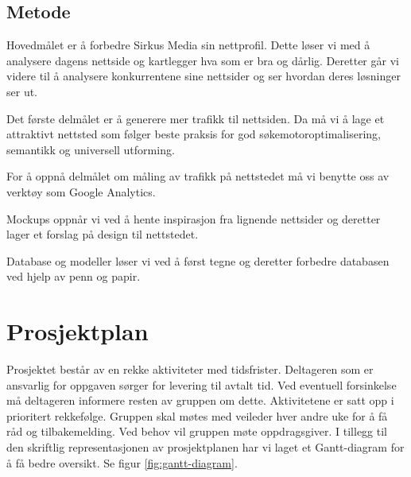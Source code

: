 \subsection{Metode}

Hovedmålet er å forbedre Sirkus Media sin nettprofil. Dette løser vi med å analysere dagens nettside og kartlegger hva som er bra og dårlig. Deretter går vi videre til å analysere konkurrentene sine nettsider og ser hvordan deres løsninger ser ut. 

Det første delmålet er å generere mer trafikk til nettsiden. Da må vi å lage et attraktivt nettsted som følger beste praksis for god søkemotoroptimalisering, semantikk og universell utforming. 

For å oppnå delmålet om måling av trafikk på nettstedet må vi benytte oss av verktøy som Google Analytics. 

Mockups oppnår vi ved å hente inspirasjon fra lignende nettsider og deretter lager et forslag på design til nettstedet.

Database og modeller løser vi ved å først tegne og deretter forbedre databasen ved hjelp av penn og papir. 


\section*{Prosjektplan}
Prosjektet består av en rekke aktiviteter med tidsfrister. Deltageren som er ansvarlig for oppgaven sørger for levering til avtalt tid. Ved eventuell forsinkelse må deltageren informere resten av gruppen om dette. Aktivitetene er satt opp i prioritert rekkefølge.
Gruppen skal møtes med veileder hver andre uke for å få råd og tilbakemelding. Ved behov vil gruppen møte oppdragsgiver. 
\smallskip
I tillegg til den skriftlig representasjonen av prosjektplanen har vi laget et Gantt-diagram for å få bedre oversikt. Se figur \ref{fig:gantt-diagram}.

